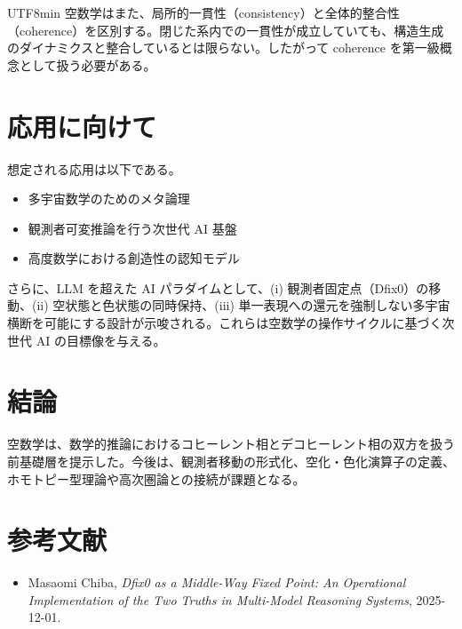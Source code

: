 \documentclass[11pt]{article}
\begin{document}
\begin{CJK}{UTF8}{min}
空数学はまた、局所的一貫性（consistency）と全体的整合性（coherence）を区別する。閉じた系内での一貫性が成立していても、構造生成のダイナミクスと整合しているとは限らない。したがって coherence を第一級概念として扱う必要がある。

\section{応用に向けて}
想定される応用は以下である。

\begin{itemize}
    \item 多宇宙数学のためのメタ論理
    \item 観測者可変推論を行う次世代 AI 基盤
    \item 高度数学における創造性の認知モデル
\end{itemize}

さらに、LLM を超えた AI パラダイムとして、(i) 観測者固定点（Dfix0）の移動、(ii) 空状態と色状態の同時保持、(iii) 単一表現への還元を強制しない多宇宙横断を可能にする設計が示唆される。これらは空数学の操作サイクルに基づく次世代 AI の目標像を与える。

\section{結論}
空数学は、数学的推論におけるコヒーレント相とデコヒーレント相の双方を扱う前基礎層を提示した。今後は、観測者移動の形式化、空化・色化演算子の定義、ホモトピー型理論や高次圏論との接続が課題となる。

\section*{参考文献}
\begin{itemize}
    \item Masaomi Chiba, \emph{Dfix0 as a Middle-Way Fixed Point: An Operational Implementation of the Two Truths in Multi-Model Reasoning Systems}, 2025-12-01.
\end{itemize}

\end{CJK}
\end{document}

